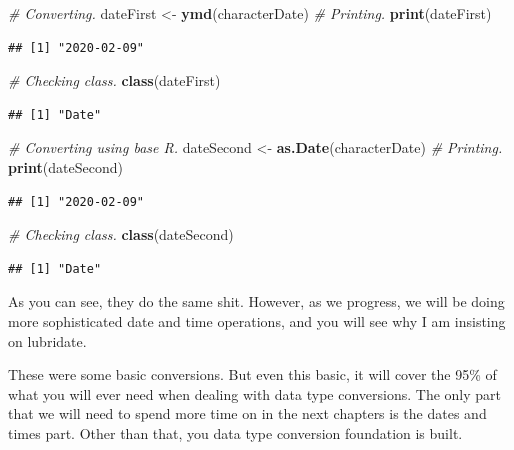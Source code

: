 \documentclass[]{book}
\newenvironment{Shaded}{\begin{snugshade}}{\end{snugshade}}
\newcommand{\CommentTok}[1]{\textcolor[rgb]{0.56,0.35,0.01}{\textit{#1}}}
\newcommand{\KeywordTok}[1]{\textcolor[rgb]{0.13,0.29,0.53}{\textbf{#1}}}
\newcommand{\NormalTok}[1]{#1}
\newcommand{\StringTok}[1]{\textcolor[rgb]{0.31,0.60,0.02}{#1}}
\begin{document}
\begin{Shaded}
\begin{Highlighting}[]
\CommentTok{# Converting.}
\NormalTok{dateFirst <-}\StringTok{ }\KeywordTok{ymd}\NormalTok{(characterDate)}
\CommentTok{# Printing.}
\KeywordTok{print}\NormalTok{(dateFirst)}
\end{Highlighting}
\end{Shaded}

\begin{verbatim}
## [1] "2020-02-09"
\end{verbatim}

\begin{Shaded}
\begin{Highlighting}[]
\CommentTok{# Checking class.}
\KeywordTok{class}\NormalTok{(dateFirst)}
\end{Highlighting}
\end{Shaded}

\begin{verbatim}
## [1] "Date"
\end{verbatim}

\begin{Shaded}
\begin{Highlighting}[]
\CommentTok{# Converting using base R.}
\NormalTok{dateSecond <-}\StringTok{ }\KeywordTok{as.Date}\NormalTok{(characterDate)}
\CommentTok{# Printing.}
\KeywordTok{print}\NormalTok{(dateSecond)}
\end{Highlighting}
\end{Shaded}

\begin{verbatim}
## [1] "2020-02-09"
\end{verbatim}

\begin{Shaded}
\begin{Highlighting}[]
\CommentTok{# Checking class.}
\KeywordTok{class}\NormalTok{(dateSecond)}
\end{Highlighting}
\end{Shaded}

\begin{verbatim}
## [1] "Date"
\end{verbatim}

As you can see, they do the same shit. However, as we progress, we will be doing more sophisticated date and time operations, and you will see why I am insisting on lubridate.

These were some basic conversions. But even this basic, it will cover the 95\% of what you will ever need when dealing with data type conversions. The only part that we will need to spend more time on in the next chapters is the dates and times part. Other than that, you data type conversion foundation is built.
\end{document}
